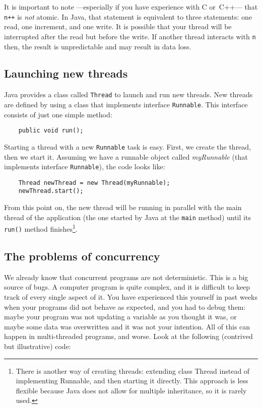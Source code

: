 It is important to note ---especially if you have experience with C
or~C++--- that \verb_n++_ is \emph{not} atomic. In Java, that
statement is equivalent to three statements: one read, one increment,
and one write. It is possible that your thread will be interrupted
after the read but before the write. If another thread interacts
with \verb+n+ then, the result is unpredictable and may result in data
loss. 

\subsection{Launching new threads}
\label{sec:launch-new-thre}

Java provides a class called \verb+Thread+ to launch and run new threads. New
threads are defined by using a class that implements interface
\verb+Runnable+. This interface consists of just one simple method: 

\begin{verbatim}
    public void run();
\end{verbatim}

Starting a thread with a new \verb+Runnable+ task is easy. First, we
create the thread, then we start it. Assuming we have a runnable
object called \emph{myRunnable} (that implements 
interface \verb+Runnable+), the code looks like:

\begin{verbatim}
    Thread newThread = new Thread(myRunnable);
    newThread.start();
\end{verbatim}

From this point on, the new thread will be running in parallel with
the main thread of the application (the one started by Java at the
\verb+main+ method) until its \verb+run()+ method
finishes\footnote{There is another way of creating threads: extending
  class Thread instead of implementing Runnable, and then starting it
  directly. This approach is less flexible because Java 
  does not allow for multiple inheritance, so it is rarely used.}. 

\subsection{The problems of concurrency}
\label{sec:problems-concurrency}

We already know that concurrent programs are not deterministic. This
is a big source of bugs. A computer program is quite complex, and it
is difficult to keep track of every single aspect of it. You have
experienced this yourself in past weeks when your programs did not
behave as expected, and you had to debug them: maybe your program was
not updating a variable as you thought it was, or maybe some data was
overwritten and it was not your intention. All of this can happen in
multi-threaded programs, and worse. Look at the following (contrived
but illustrative) code: 


